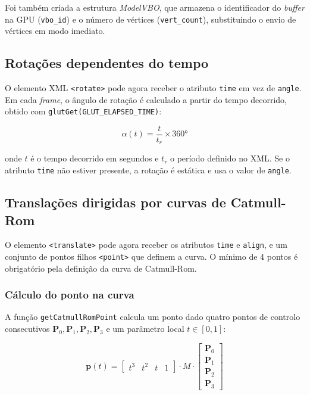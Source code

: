 \documentclass[12pt,a4paper]{article}
\begin{document}
Foi também criada a estrutura \textit{ModelVBO}, que armazena o identificador do \textit{buffer} na GPU (\texttt{vbo\_id}) e o número de vértices (\texttt{vert\_count}), substituindo o envio de vértices em modo imediato.

\subsection{Rotações dependentes do tempo}

O elemento XML \texttt{<rotate>} pode agora receber o atributo \texttt{time} em vez de \texttt{angle}. Em cada \textit{frame}, o ângulo de rotação é calculado a partir do tempo decorrido, obtido com \texttt{glutGet(GLUT\_ELAPSED\_TIME)}:

\begin{equation}
    \alpha(t) = \frac{t}{t_r} \times 360°
    \label{eq:rotacao}
\end{equation}

onde $t$ é o tempo decorrido em segundos e $t_r$ o período definido no XML. Se o atributo \texttt{time} não estiver presente, a rotação é estática e usa o valor de \texttt{angle}.

\subsection{Translações dirigidas por curvas de Catmull-Rom}

O elemento \texttt{<translate>} pode agora receber os atributos \texttt{time} e \texttt{align}, e um conjunto de pontos filhos \texttt{<point>} que definem a curva. O mínimo de 4 pontos é obrigatório pela definição da curva de Catmull-Rom.

\subsubsection{Cálculo do ponto na curva}

A função \texttt{getCatmullRomPoint} calcula um ponto dado quatro pontos de controlo consecutivos $\mathbf{P}_0, \mathbf{P}_1, \mathbf{P}_2, \mathbf{P}_3$ e um parâmetro local $t \in [0,1]$:

\begin{equation}
    \mathbf{p}(t) = \begin{bmatrix} t^3 & t^2 & t & 1 \end{bmatrix} \cdot M \cdot \begin{bmatrix} \mathbf{P}_0 \\ \mathbf{P}_1 \\ \mathbf{P}_2 \\ \mathbf{P}_3 \end{bmatrix}
    \label{eq:catmull}
\end{equation}
\end{document}
